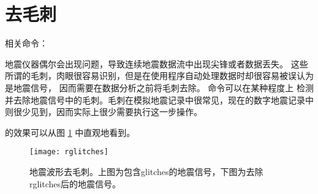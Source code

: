 \section{去毛刺}
相关命令：

地震仪器偶尔会出现问题，导致连续地震数据流中出现尖锋或者数据丢失。
这些所谓的毛刺，肉眼很容易识别，但是在使用程序自动处理数据时却很容易被误认为是地震信号，
因而需要在数据分析之前将毛刺去除。 命令可以在某种程度上
检测并去除地震信号中的毛刺。毛刺在模拟地震记录中很常见，现在的数字地震记录中
则很少见到，因而实际上很少需要执行这一步操作。

 的效果可以从图 \ref{fig:deglitches} 中直观地看到。
\begin{figure}[H]
\centering
\texttt{[image: rglitches]}
\caption[地震波形去毛刺]{地震波形去毛刺。上图为包含glitches的地震信号，下图为去除
rglitches后的地震信号。}
\label{fig:deglitches}
\end{figure}
